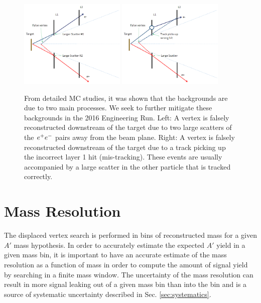 \begin{figure}
    \centering
    \includegraphics[width=0.45\textwidth]{figs/selection/large_scatter_bg.png}
    \includegraphics[width=0.45\textwidth]{figs/selection/iso_bck.png}
    \caption{From detailed MC studies, it was shown that the backgrounds are due to two main processes. We seek to further mitigate these backgrounds in the 2016 Engineering Run. Left: A vertex is falsely reconstructed downstream of the target due to two large scatters of the $e^{+}e^{-}$ pairs away from the beam plane. Right: A vertex is falsely reconstructed downstream of the target due to a track picking up the incorrect layer 1 hit (mis-tracking). These events are usually accompanied by a large scatter in the other particle that is tracked correctly.}
    \label{fig:2015backgrounds}
\end{figure}

\clearpage

\section{Mass Resolution}\label{sec:massresolution}

The displaced vertex search is performed in bins of reconstructed mass for a given $A'$ mass hypothesis. In order to accurately estimate the expected $A'$ yield in a given mass bin, it is important to have an accurate estimate of the mass resolution as a function of mass in order to compute the amount of signal yield by searching in a finite mass window. The uncertainty of the mass resolution can result in more signal leaking out of a given mass bin than into the bin and is a source of systematic uncertainty described in Sec. \ref{sec:systematics}. 


